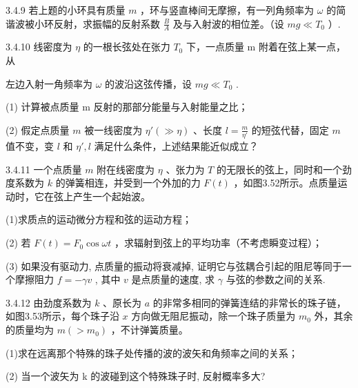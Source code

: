 \begin{problem}{3.4.9}
若上题的小环具有质量 $m$ ，环与竖直棒间无摩擦，有一列角频率为 $\omega$ 的简谐波被小环反射，求振幅的反射系数 $\frac{B}{A}$ 及与入射波的相位差。（设 $mg \ll T_0$ ）.
\end{problem}
\clearpage


\begin{problem}{3.4.10}
线密度为 $\eta$ 的一根长弦处在张力 $T_{0}$ 下，一点质量 m 附着在弦上某一点，从

左边入射一角频率为 $\omega$ 的波沿这弦传播，设 $mg \ll T_{0}$ .

(1) 计算被点质量 m 反射的那部分能量与入射能量之比；

(2) 假定点质量 $m$ 被一线密度为 $\eta' (\gg \eta)$ 、长度 $l = \frac{m}{\eta'}$ 的短弦代替，固定 $m$ 值不变，变 $l$ 和 $\eta', l$ 满足什么条件，上述结果能近似成立？
\end{problem}
\clearpage


\begin{problem}{3.4.11}
一个点质量 $m$ 附在线密度为 $\eta$ 、张力为 $T$ 的无限长的弦上，同时和一个劲度系数为 $k$ 的弹簧相连，并受到一个外加的力 $F(t)$ ，如图3.52所示。点质量运动时，它在弦上产生一个起始波。

(1)求质点的运动微分方程和弦的运动方程；

(2) 若 $F(t)=F_{0}\cos\omega t$ ，求辐射到弦上的平均功率（不考虑瞬变过程）；

(3) 如果没有驱动力, 点质量的振动将衰减掉, 证明它与弦耦合引起的阻尼等同于一个摩擦阻力 $f = -\gamma v$ , 其中 $v$ 是点质量的速度, 求 $\gamma$ 与弦的参数之间的关系.
\begin{center}

\end{center}
\end{problem}
\clearpage


\begin{problem}{3.4.12}
由劲度系数为 $k$ 、原长为 $a$ 的非常多相同的弹簧连结的非常长的珠子链，如图3.53所示，每个珠子沿 $x$ 方向做无阻尼振动，除一个珠子质量为 $m_0$ 外，其余的质量均为 $m (> m_0)$ ，不计弹簧质量。

(1)求在远离那个特殊的珠子处传播的波的波矢和角频率之间的关系；

(2) 当一个波矢为 k 的波碰到这个特殊珠子时, 反射概率多大?
\begin{center}

\end{center}
\end{problem}
\clearpage


